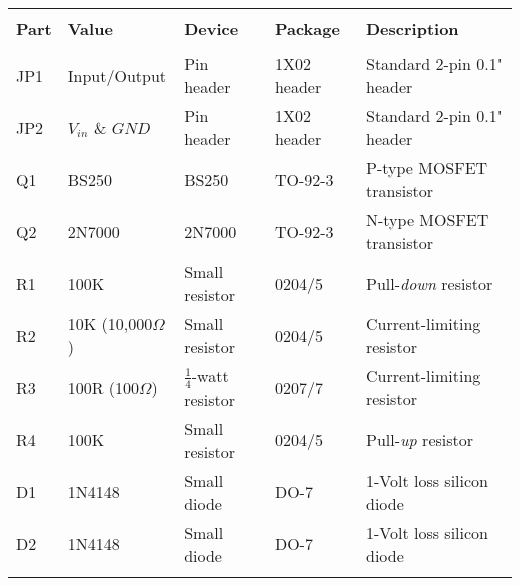 \begin{tabular}{lllll}
\hline\\[\negsep]
\textbf{Part} & \textbf{Value} & \textbf{Device} & \textbf{Package} & \textbf{Description} \\[\sep]
\hline\\[\negsep]
JP1  &  Input/Output & Pin header    & 1X02 header     & Standard 2-pin 0.1" header \\[\sep]
JP2  &  $V_{in}$ \& $GND$ & Pin header & 1X02 header     & Standard 2-pin 0.1" header \\[\sep]
Q1   &  BS250       &  BS250         & TO-92-3     & P-type MOSFET transistor \\[\sep]
Q2   &  2N7000      & 2N7000         & TO-92-3     & N-type MOSFET transistor \\[\sep]
R1   &  100K        & Small resistor & 0204/5    & Pull-\emph{down} resistor \\[\sep]
R2   &  10K (10,000$\Omega$)         & Small resistor & 0204/5    & Current-limiting resistor \\[\sep]
R3   &  100R (100$\Omega$) & $\frac{1}{4}$-watt resistor & 0207/7 & Current-limiting resistor \\[\sep]
R4   &  100K       & Small resistor & 0204/5    & Pull-\emph{up} resistor \\[\sep]
D1   &  1N4148       & Small diode  & DO-7      & 1-Volt loss silicon diode   \\[\sep]
D2   &  1N4148       & Small diode  & DO-7      & 1-Volt loss silicon diode   \\[\sep]

\hline\\
\end{tabular}
